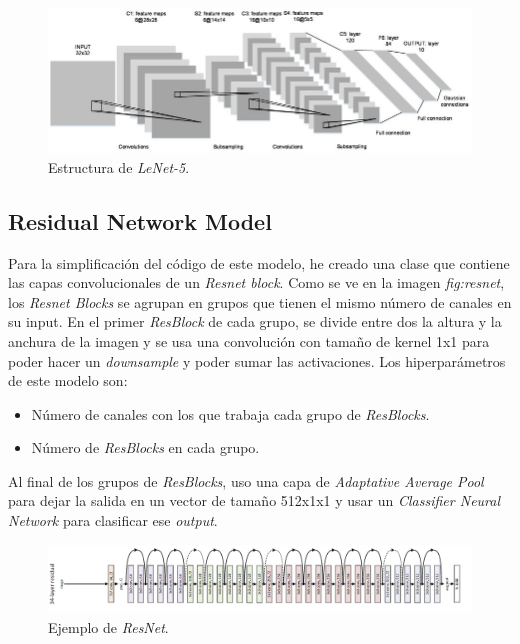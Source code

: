 \begin{figure}[H]
	\includegraphics[scale=0.4]{imagenes/05_Implementacion/lenet5.png}
	\centering
	\caption{Estructura de \textit{LeNet-5}. \cite{Lecun98gradient-basedlearning}}
	\label{fig:convnet}
\end{figure}

\subsection{Residual Network Model}
\label{subsec:resnet}

Para la simplificación del código de este modelo, he creado una clase que contiene las capas convolucionales de un \textit{Resnet block}. Como se ve en la imagen \textit{fig:resnet}, los \textit{Resnet Blocks} se agrupan en grupos que tienen el mismo número de canales en su input. En el primer \textit{ResBlock} de cada grupo, se divide entre dos la altura y la anchura de la imagen y se usa una convolución con tamaño de kernel 1x1 para poder hacer un \textit{downsample} y poder sumar las activaciones. Los hiperparámetros de este modelo son:

\begin{itemize}
	\item Número de canales con los que trabaja cada grupo de \textit{ResBlocks}.
	\item Número de \textit{ResBlocks} en cada grupo.
\end{itemize}

Al final de los grupos de \textit{ResBlocks}, uso una capa de \textit{Adaptative Average Pool} para dejar la salida en un vector de tamaño 512x1x1 y usar un \textit{Classifier Neural Network} para clasificar ese \textit{output}.

\begin{figure}[H]
	\includegraphics[width=1.\linewidth]{imagenes/05_Implementacion/resnet.png}
	\centering
	\caption{Ejemplo de \textit{ResNet}. \cite{DBLP:journals/corr/HeZRS15}}
	\label{fig:resnet}
\end{figure}

